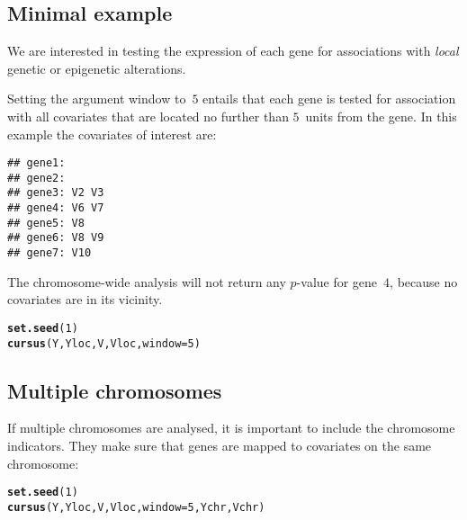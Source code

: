 \documentclass{article}\usepackage[]{graphicx}\usepackage[]{color}
\makeatletter
\newcommand{\hlnum}[1]{\textcolor[rgb]{0.686,0.059,0.569}{#1}}%
\newcommand{\hlstd}[1]{\textcolor[rgb]{0.345,0.345,0.345}{#1}}%
\newcommand{\hlkwc}[1]{\textcolor[rgb]{0.333,0.667,0.333}{#1}}%
\newcommand{\hlkwd}[1]{\textcolor[rgb]{0.737,0.353,0.396}{\textbf{#1}}}%
\newenvironment{kframe}{%
 \def\at@end@of@kframe{}%
 \ifinner\ifhmode%
  \def\at@end@of@kframe{\end{minipage}}%
  \begin{minipage}{\columnwidth}%
 \fi\fi%
 \def\FrameCommand##1{\hskip\@totalleftmargin \hskip-\fboxsep
 \colorbox{shadecolor}{##1}\hskip-\fboxsep
     \hskip-\linewidth \hskip-\@totalleftmargin \hskip\columnwidth}%
 \MakeFramed {\advance\hsize-\width
   \@totalleftmargin\z@ \linewidth\hsize
   \@setminipage}}%
 {\par\unskip\endMakeFramed%
 \at@end@of@kframe}
\newenvironment{knitrout}{}{} %
\makeatother
\begin{document}
\subsection{Minimal example}
\label{GWA Minimal example}

We are interested in testing the expression of each gene for associations with \textit{local} genetic or epigenetic alterations.

Setting the argument window to~$5$ entails that each gene is tested for association with all covariates that are located no further than $5$~units from the gene. In this example the covariates of interest are:

\begin{knitrout}
\color{fgcolor}\begin{kframe}
\begin{verbatim}
## gene1:  
## gene2:  
## gene3: V2 V3 
## gene4: V6 V7 
## gene5: V8 
## gene6: V8 V9 
## gene7: V10
\end{verbatim}
\end{kframe}
\end{knitrout}

The chromosome-wide analysis will not return any \mbox{$p$-value} for gene~$4$, because no covariates are in its vicinity.
\begin{knitrout}
\color{fgcolor}\begin{kframe}
\begin{alltt}
\hlkwd{set.seed}\hlstd{(}\hlnum{1}\hlstd{)}
\hlkwd{cursus}\hlstd{(Y,Yloc,V,Vloc,}\hlkwc{window}\hlstd{=}\hlnum{5}\hlstd{)}
\end{alltt}
\end{kframe}
\end{knitrout}

\subsection{Multiple chromosomes}
\label{GWA Mutiple chromosomes}

If multiple chromosomes are analysed, it is important to include the chromosome indicators. They make sure that genes are mapped to covariates on the same chromosome:
\begin{knitrout}
\color{fgcolor}\begin{kframe}
\begin{alltt}
\hlkwd{set.seed}\hlstd{(}\hlnum{1}\hlstd{)}
\hlkwd{cursus}\hlstd{(Y,Yloc,V,Vloc,}\hlkwc{window}\hlstd{=}\hlnum{5}\hlstd{,Ychr,Vchr)}
\end{alltt}
\end{kframe}
\end{knitrout}
\end{document}
